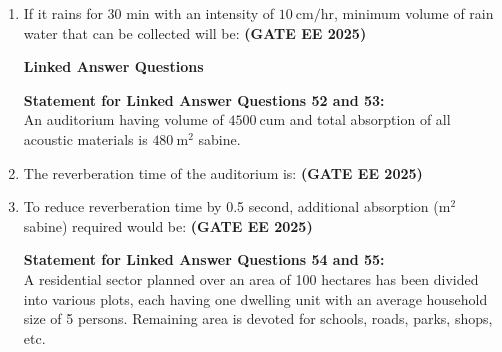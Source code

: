 \documentclass[journal,12pt,onecolumn]{IEEEtran}
\theoremstyle{remark}
\begin{document}
{\begin{enumerate}
\item If it rains for 30 min with an intensity of $10\ \text{cm/hr}$, minimum volume of rain water that can be collected will be: \hfill \textbf{(GATE EE 2025)}
\begin{enumerate}
\end{enumerate}

\textbf{Linked Answer Questions}

\textbf{Statement for Linked Answer Questions 52 and 53:} \\
An auditorium having volume of $4500\ \text{cum}$ and total absorption of all acoustic materials is $480\ \text{m}^2$ sabine.

\item  The reverberation time of the auditorium is: \hfill \textbf{(GATE EE 2025)}
\begin{enumerate}
\end{enumerate}

\item To reduce reverberation time by 0.5 second, additional absorption ($\text{m}^2$ sabine) required would be: \hfill \textbf{(GATE EE 2025)}
\begin{enumerate}
\end{enumerate}

\textbf{Statement for Linked Answer Questions 54 and 55:} \\
A residential sector planned over an area of 100 hectares has been divided into various plots, each having one dwelling unit with an average household size of 5 persons. Remaining area is devoted for schools, roads, parks, shops, etc.


\end{enumerate}}
\end{document}
